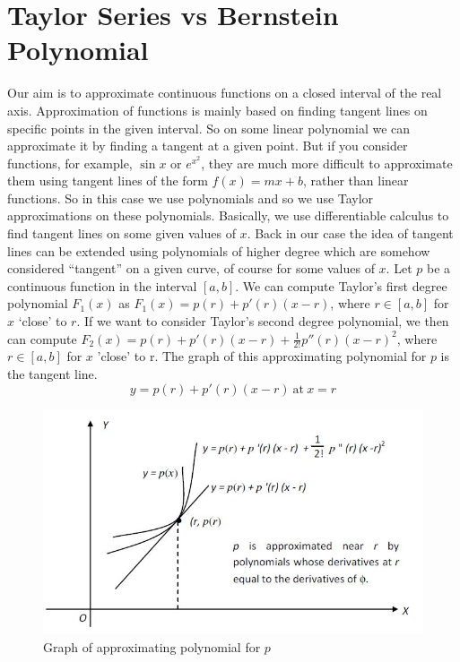 \documentclass{article}
\begin{document}
\section{Taylor Series vs Bernstein Polynomial}\label{sec:tsvsbp}
Our aim is to approximate continuous functions on a closed interval of the real axis. Approximation of functions is mainly based on finding tangent lines on specific points in the given interval. So on some linear polynomial we can approximate it by finding a tangent at a given point. But if you consider functions, for example, $\sin x$ or  $e^{x^2} $, they are much more difficult to approximate them using tangent lines of the form $f(x) =mx+b$, rather than linear functions. So in this case we use polynomials and so we use Taylor approximations on these polynomials. Basically, we use differentiable calculus to find tangent lines on some given values of $x$. Back in our case the idea of tangent lines can be extended using polynomials of higher degree which are somehow considered ``tangent'' on a given curve, of course for some values of $x$.
Let $p$ be a continuous function in the interval $[a,b]$.
We can compute Taylor’s first degree polynomial $F_1(x)$ as $F_1(x)=p(r) + p'(r) (x - r)$, where $r \in [a,b]$ for $x$ `close' to $r$.
If we want to consider Taylor’s second degree polynomial, we then can compute $F_2(x)= p(r) + p '(r) (x - r)+ \frac{1}{2!}p''(r) (x - r)^2$, where $r \in [a,b]$ for $x$ 'close' to r.
The graph of this approximating polynomial for $p$ is the tangent line.
\begin{equation*}
    y=p(r)+p'(r)(x-r) \ \text{at}\ x=r
\end{equation*}
\begin{figure}[h!]
\centering
\includegraphics[width=1\textwidth]{Project-weierstrass.JPG}
    \caption{Graph of approximating polynomial for $p$}
    \label{fig:1}
\end{figure}
\end{document}
